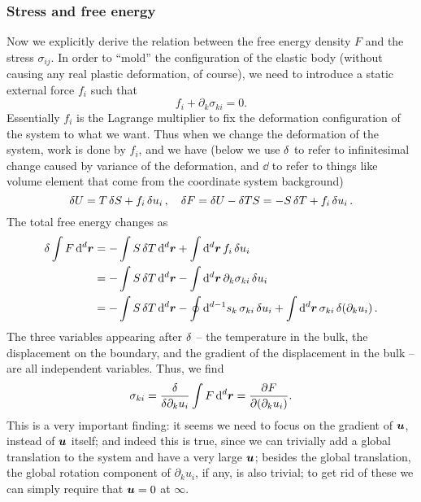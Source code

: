 \documentclass[hyperref, a4paper]{article}
\begin{document}
\subsubsection{Stress and free energy}

Now we explicitly derive the relation between the free energy density $F$
and the stress $\sigma_{ij}$.
In order to ``mold'' the configuration of the elastic body 
(without causing any real plastic deformation, of course),
we need to introduce a static external force $f_i$ such that 
\begin{equation}
    f_i + \partial_k \sigma_{ki} = 0.
\end{equation}
Essentially $f_i$ is the Lagrange multiplier 
to fix the deformation configuration of the system to what we want.
Thus when we change the deformation of the system,
work is done by $f_i$,
and we have (below we use $\var$ to refer to infinitesimal change 
caused by variance of the deformation,
and $\dd$ to refer to things like volume element 
that come from the coordinate system background)
\begin{equation}
    \var{U} = T \var{S} + f_i \var{u}_i, \quad 
    \var{F} = \var{U} - \var{TS} = - S \var{T} + f_i \var{u}_i.
\end{equation}
The total free energy changes as 
\begin{equation}
    \begin{aligned}
        \var \int F \dd[d]{\vb*{r}} &= - \int S \var{T} \dd[d]{\vb*{r}} 
        + \int \dd[d]{\vb*{r}} f_i \var{u_i}  \\
        &= - \int S \var{T} \dd[d]{\vb*{r}} 
        - \int \dd[d]{\vb*{r}} \partial_k \sigma_{ki} \var{u_i} \\
        &= - \int S \var{T} \dd[d]{\vb*{r}}
        - \oint \dd[d-1]{s_k} \sigma_{ki} \var{u_i}
        + \int \dd[d]{\vb*{r}} \sigma_{ki} \var (\partial_k u_i).
    \end{aligned}
\end{equation}
The three variables appearing after $\var$ -- the temperature in the bulk,
the displacement on the boundary,
and the gradient of the displacement in the bulk -- 
are all independent variables.
Thus, we find 
\begin{equation}
    \sigma_{ki} = \fdv{\partial_k u_i} \int F \dd[d]{\vb*{r}} = \pdv{F}{(\partial_k u_i)}.
\end{equation}
This is a very important finding:
it seems we need to focus on the gradient of $\vb*{u}$,
instead of $\vb*{u}$ itself;
and indeed this is true,
since we can trivially add a global translation to the system 
and have a very large $\vb*{u}$;
besides the global translation,
the global rotation component of $\partial_k u_i$, if any, is also trivial;
to get rid of these we can simply require that $\vb*{u} = 0$ at $\infty$.
\end{document}
